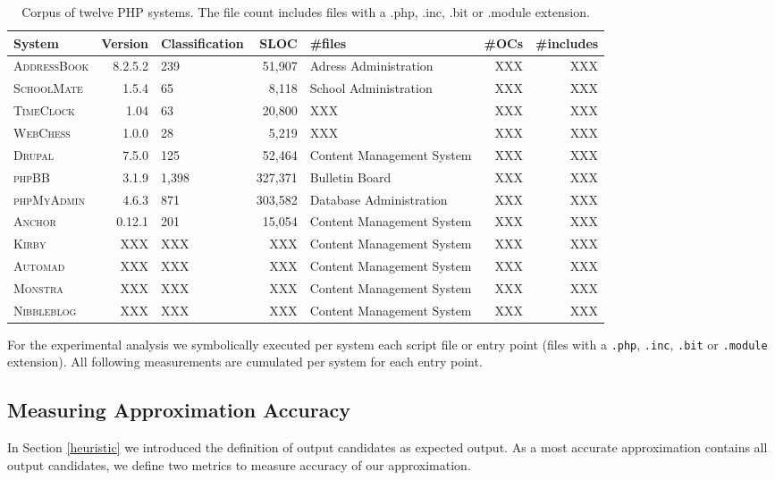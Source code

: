 \documentclass[preprint]{sig-alternate-05-2015}
\begin{document}
\begin{table}[t]
\centering 
	\begin{tabular}{lrp{4cm}rlrr}
	\toprule
	\textbf{System} & \textbf{Version} & \textbf{Classification} & \textbf{SLOC} & \textbf{\#files} & \textbf{\#OCs} & \textbf{\#includes}
	\\
	\midrule
	\textsc{AddressBook} & 8.2.5.2 & 239 & 51,907 & Adress Administration  & XXX & XXX\\
	\textsc{SchoolMate} & 1.5.4 & 65 & 8,118 & School Administration  & XXX & XXX\\
	\textsc{TimeClock} & 1.04 & 63 & 20,800 & XXX  & XXX & XXX\\
	\textsc{WebChess} & 1.0.0 & 28 & 5,219 & XXX  & XXX & XXX\\
	\midrule
	\textsc{Drupal} & 7.5.0 & 125 & 52,464 & Content Management System  & XXX & XXX\\
	\textsc{phpBB} & 3.1.9 & 1,398 & 327,371 & Bulletin Board  & XXX & XXX\\
	\textsc{phpMyAdmin} & 4.6.3 & 871 & 303,582 & Database Administration  & XXX & XXX\\
	\midrule
	\textsc{Anchor} & 0.12.1 & 201 & 15,054 & Content Management System  & XXX & XXX\\
	\textsc{Kirby} & XXX & XXX & XXX & Content Management System  & XXX & XXX\\
	\textsc{Automad} & XXX & XXX & XXX & Content Management System  & XXX & XXX\\
	\textsc{Monstra} & XXX & XXX & XXX & Content Management System  & XXX & XXX\\
	\textsc{Nibbleblog} & XXX & XXX & XXX & Content Management System  & XXX & XXX\\
	\bottomrule
	\end{tabular}
	\caption{Corpus of twelve PHP systems. The file count includes files with a .php,
	.inc, .bit or .module extension.}
	\label{corpus}
\end{table}

For the experimental analysis we symbolically executed per system each script file or entry point (files with a \texttt{.php}, \texttt{.inc}, \texttt{.bit} or \texttt{.module} extension). All following measurements are cumulated per system for each entry point. 

\subsection{Measuring Approximation Accuracy}
\label{HowAccurateIsOurApproximation} 
In Section \ref{heuristic} we introduced the definition of output candidates as expected output. As a most accurate approximation contains all output candidates, we define two metrics to measure accuracy of our approximation. 
\end{document}
